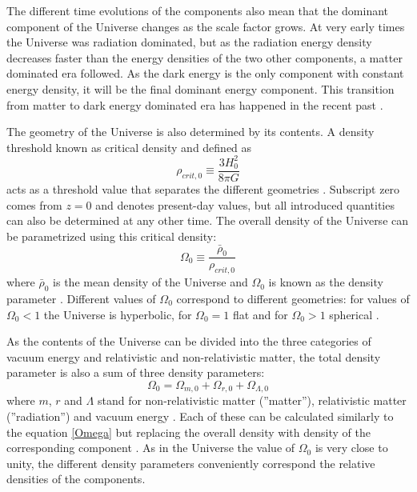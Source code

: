 \documentclass[english, oneside]{HYgradu}
\begin{document}
The different time evolutions of the components also mean that the dominant component of the Universe changes as the scale factor grows. At very early times the Universe was radiation dominated, but as the radiation energy density decreases faster than the energy densities of the two other components, a matter dominated era followed. As the dark energy is the only component with constant energy density, it will be the final dominant energy component. This transition from matter to dark energy dominated era has happened in the recent past \citep{mo2010galaxy}.

The geometry of the Universe is also determined by its contents. A density threshold known as critical density and defined as
\begin{equation}
\rho_{crit,0} \equiv \frac{3H_0^2}{8\pi G}
\end{equation}
acts as a threshold value that separates the different geometries \citep{mo2010galaxy}. Subscript zero comes from $z=0$ and denotes present-day values, but all introduced quantities can also be determined at any other time. The overall density of the Universe can be parametrized using this critical density:
\begin{equation} \label{Omega}
\Omega_0 \equiv \frac{\bar \rho_0}{\rho_{crit,0}}
\end{equation}
where $\bar\rho_0$ is the mean density of the Universe and $\Omega_0$ is known as the density parameter \citep{mo2010galaxy}. Different values of $\Omega_0$ correspond to different geometries: for values of $\Omega_0 < 1$ the Universe is hyperbolic, for $\Omega_0 = 1$ flat and for  $\Omega_0 > 1$ spherical \citep{mo2010galaxy}.

As the contents of the Universe can be divided into the three categories of vacuum energy and relativistic and non-relativistic matter, the total density parameter is also a sum of three density parameters:
\begin{equation}
\Omega_0 = \Omega_{m,0} + \Omega_{r, 0} + \Omega_{\Lambda, 0}
\end{equation}
where $m$, $r$ and $\Lambda$ stand for non-relativistic matter (''matter''), relativistic matter (''radiation'') and vacuum energy \citep{mo2010galaxy}. Each of these can be calculated similarly to the equation \ref{Omega} but replacing the overall density with density of the corresponding component \citep{mo2010galaxy}. As in the Universe the value of $\Omega_0$ is very close to unity, the different density parameters conveniently correspond the relative densities of the components.
\end{document}
